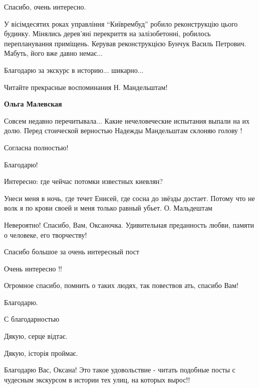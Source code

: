 \begin{itemize}
Спасибо, очень интересно.



У вісімдесятих роках управління \enquote{Київрембуд} робило реконструкцію цього
будинку. Мінялись дерев'яні перекриття на залізобетонні, робилось
перепланування приміщень. Керував реконструкцією Бунчук Василь Петрович.
Мабуть, його вже давно немає...


Благодарю за экскурс в историю... шикарно...

Читайте прекрасные воспоминания Н. Мандельштам!

\begin{itemize} %
\textbf{Ольга Малевская} 

Совсем недавно перечитывала... Какие нечеловеческие испытания выпали на их долю.
Перед стоической верностью Надежды Мандельштам склоняю голову !


Согласна полностью!

\end{itemize} %

Благодарю!

Интересно: где чейчас потомки известных киевлян?


Унеси меня в ночь, где течет Енисей, где сосна до звёзды достает. Потому что не
волк я по крови своей и меня только равный убьет. О. Мальдештам

Невероятно! Спасибо, Вам, Оксаночка. Удивительная преданность любви, памяти о
человеке, его творчеству!

Спасибо большое за очень интересный пост

Очень интересно !!

Огромное спасибо, помнить о таких людях, так повествов ать, спасибо Вам!

Благодарю.

С благодарностью

Дякую, серце відтає.

Дякую, історія проймає.


Благодарю Вас, Оксана! Это такое удовольствие - читать подобные посты с
чудесным экскурсом в истории тех улиц, на которых вырос!!


\end{itemize}
